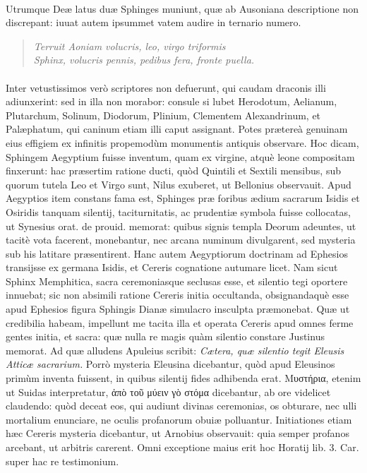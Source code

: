 \documentclass[a4paper, 11pt, oneside, polutonikogreek, latin]{article}
\begin{document}
\paragraph{}
Utrumque Deæ latus duæ Sphinges muniunt, quæ ab Ausoniana descriptione non discrepant: iuuat autem ipsummet vatem audire in ternario numero.
\begin{quote}
\emph{Terruit Aoniam volucris, leo, virgo triformis}\\
\emph{Sphinx, volucris pennis, pedibus fera, fronte puella.}\\
\end{quote}
\vspace*{-8mm}
\paragraph{}
Inter vetustissimos verò scriptores non defuerunt, qui caudam draconis illi adiunxerint: sed in illa non morabor: consule si lubet Herodotum, Aelianum, Plutarchum, Solinum, Diodorum, Plinium, Clementem Alexandrinum, et Palæphatum, qui caninum etiam illi caput assignant. Potes prætereà genuinam eius effigiem ex infinitis propemodùm monumentis antiquis observare. Hoc dicam, Sphingem Aegyptium fuisse inventum, quam ex virgine, atquè leone compositam finxerunt: hac præsertim ratione ducti, quòd Quintili et Sextili mensibus, sub quorum tutela Leo et Virgo sunt, Nilus exuberet, ut Bellonius observauit. Apud Aegyptios item constans fama est, Sphinges præ foribus ædium sacrarum Isidis et Osiridis tanquam silentij, taciturnitatis, ac prudentiæ symbola fuisse collocatas, ut Synesius orat. de prouid. memorat: quibus signis templa Deorum adeuntes, ut tacitè vota facerent, monebantur, nec arcana numinum divulgarent, sed mysteria sub his latitare præsentirent. Hanc autem Aegyptiorum doctrinam ad Ephesios transijsse ex germana Isidis, et Cereris cognatione autumare licet. Nam sicut Sphinx Memphitica, sacra ceremoniasque seclusas esse, et silentio tegi oportere innuebat; sic non absimili ratione Cereris initia occultanda, obsignandaquè esse apud Ephesios figura Sphingis Dianæ simulacro insculpta præmonebat. Quæ ut credibilia habeam, impellunt me tacita illa et operata Cereris apud omnes ferme gentes initia, et sacra: quæ nulla re magis quàm silentio constare Justinus memorat. Ad quæ alludens Apuleius scribit: \emph{Cætera, quæ silentio tegit Eleusis Atticæ sacrarium.} Porrò mysteria Eleusina dicebantur, quòd apud Eleusinos primùm inventa fuissent, in quibus silentij fides adhibenda erat. Μυστήρια, etenim ut Suidas interpretatur, ἀπὸ τοῦ μύειν 	γὸ στόμα dicebantur, ab ore videlicet claudendo: quòd deceat eos, qui audiunt divinas ceremonias, os obturare, nec ulli mortalium enunciare, ne oculis profanorum obuiæ polluantur. Initiationes etiam hæc Cereris mysteria dicebantur, ut Arnobius observauit: quia semper profanos arcebant, ut arbitris carerent. Omni exceptione maius erit hoc Horatij lib. 3. Car. super hac re testimonium.
\end{document}
